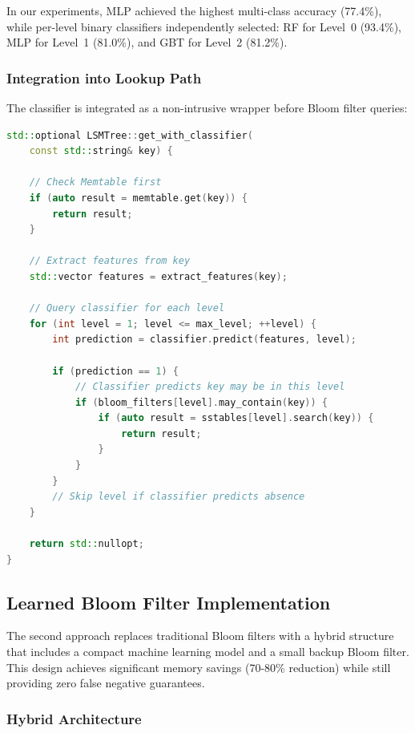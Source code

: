 \documentclass{mnitjaipur}
\begin{document}
In our experiments, MLP achieved the highest multi-class accuracy (77.4\%), while per-level binary classifiers independently selected: RF for Level~0 (93.4\%), MLP for Level~1 (81.0\%), and GBT for Level~2 (81.2\%).

\subsubsection{Integration into Lookup Path}

The classifier is integrated as a non-intrusive wrapper before Bloom filter queries:

\begin{lstlisting}[language=C++, caption={Classifier-augmented GET operation}, label={lst:classifier-get}]
std::optional LSMTree::get_with_classifier(
    const std::string& key) {
    
    // Check Memtable first
    if (auto result = memtable.get(key)) {
        return result;
    }
    
    // Extract features from key
    std::vector features = extract_features(key);
    
    // Query classifier for each level
    for (int level = 1; level <= max_level; ++level) {
        int prediction = classifier.predict(features, level);
        
        if (prediction == 1) {
            // Classifier predicts key may be in this level
            if (bloom_filters[level].may_contain(key)) {
                if (auto result = sstables[level].search(key)) {
                    return result;
                }
            }
        }
        // Skip level if classifier predicts absence
    }
    
    return std::nullopt;
}
\end{lstlisting}

\subsection{Learned Bloom Filter Implementation}

The second approach replaces traditional Bloom filters with a hybrid structure that includes a compact machine learning model and a small backup Bloom filter. This design achieves significant memory savings (70-80\% reduction) while still providing zero false negative guarantees.

\subsubsection{Hybrid Architecture}
\end{document}
